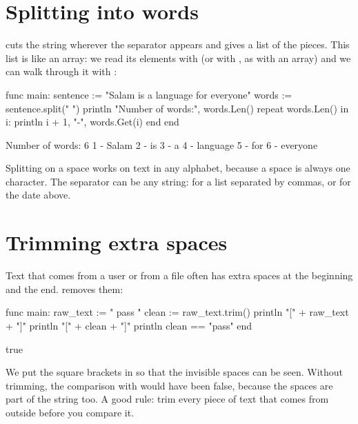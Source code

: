 \section{Splitting into words}

 cuts the string wherever the separator appears and
gives a list of the pieces. This list is like an array: we read its elements
with  (or with \code{[index]}, as with an array) and we
can walk through it with :

\begin{salamcode}
func main:
    sentence := "Salam is a language for everyone"
    words := sentence.split(" ")
    println "Number of words:", words.Len()
    repeat words.Len() in i:
        println i + 1, "-", words.Get(i)
    end
end
\end{salamcode}

\begin{salamout}
Number of words: 6
1 - Salam
2 - is
3 - a
4 - language
5 - for
6 - everyone
\end{salamout}

Splitting on a space works on text in any alphabet, because a space is
always one character. The separator can be any string:  for a list separated by
commas, or  for the date above.

\section{Trimming extra spaces}

Text that comes from a user or from a file often has extra spaces at the
beginning and the end.  removes them:

\begin{salamcode}
func main:
    raw_text := "   pass   "
    clean := raw_text.trim()
    println "[" + raw_text + "]"
    println "[" + clean + "]"
    println clean == "pass"
end
\end{salamcode}

\begin{salamout}
[   pass   ]
[pass]
true
\end{salamout}

We put the square brackets in so that the invisible spaces can be seen.
Without trimming, the comparison with  would have been false,
because the spaces are part of the string too. A good rule: trim every piece
of text that comes from outside before you compare it.

